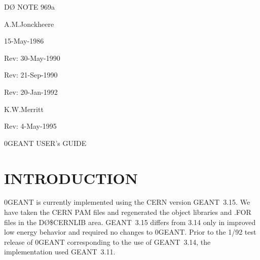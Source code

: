 %
%
%
%
%
%

%
\def\D0{D\O}


%
\begin{flushright}
\D0 NOTE 969a

A.M.Jonckheere

15-May-1986

Rev: 30-May-1990

Rev: 21-Sep-1990

Rev: 20-Jan-1992

K.W.Merritt

Rev: 4-May-1995
\end{flushright}
\vspace{1.0in}
\centerline{\D0GEANT USER's GUIDE}

\begin{abstract}
This is the user's guide to \D0GEANT, the \D0 implementation of CERN's general
High Energy Physics event Monte Carlo, GEANT3. Any comments, good or bad,
corrections, additions etc. should be addressed to Mike Diesburg via DECMAIL
at \D0SFT::DIESBURG (DIESBURG@\D0SFT.FNAL.GOV via INTERNET).
\end{abstract}

\section{INTRODUCTION}
\label{intro}

\D0GEANT is currently implemented using the CERN version GEANT~3.15. We have
taken the CERN PAM files and regenerated the object libraries and .FOR files in
the \D0\$CERNLIB area. GEANT~3.15 differs from 3.14 only in improved low energy
behavior and required no changes to \D0GEANT. Prior to the 1/92 test release
of \D0GEANT corresponding to the use of GEANT~3.14, the implementation used
GEANT~3.11.

